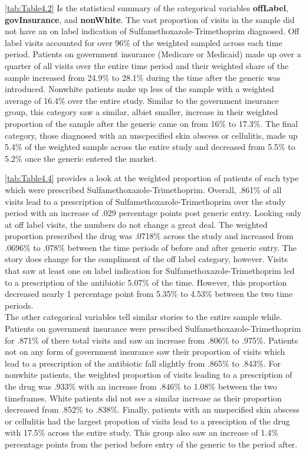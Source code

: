 \begin{landscape}

\end{landscape} 
\indent \autoref{tab:Table4.2} Is the statistical summary of the categorical variables \textbf{offLabel}, \textbf{govInsurance}, and \textbf{nonWhite}. The vast proportion of visits in the sample did not have an on label indication of Sulfamethoxazole-Trimethoprim diagnosed. Off label visits accounted for over 96\% of the weighted sampled across each time period. Patients on government insurance (Medicare or Medicaid) made up over a quarter of all visits over the entire time period and their weighted share of the sample increased from 24.9\% to 28.1\% during the time after the generic was introduced. Nonwhite patients make up less of the sample with a weighted average of 16.4\% over the entire study. Similar to the government insurance group, this category saw a similar, albiet smaller, increase in their weighted proportion of the sample after the generic came on from 16\% to 17.3\%. The final category, those diagnosed with an unscpecified skin abscess or cellulitis, made up 5.4\% of the weighted sample across the entire study and decreased from 5.5\% to 5.2\% once the generic entered the market.
\begin{landscape}

\end{landscape}
\autoref{tab:Table4.4} provides a look at the weighted proportion of patients of each type which were prescribed Sulfamethoxazole-Trimethoprim. Overall, .861\% of all visits lead to a prescription of Sulfamethoxazole-Trimethoprim over the study period with an increase of .029 percentage points post generic entry. Looking only at off label visits, the numbers do not change a great deal. The weighted proportion prescribed the drug was .0718\% across the study and increased from .0696\% to .078\% between the time periods of before and after generic entry. The story does change for the compliment of the off label category, however. Visits that saw at least one on label indication for Sulfamethoxazole-Trimethoprim led to a prescription of the antibiotic 5.07\% of the time. However, this proportion decreased nearly 1 percentage point from 5.35\% to 4.53\% between the two time periods.\\
\indent The other categorical variables tell similar stories to the entire sample while. Patients on government insurance were prescibed Sulfamethoxazole-Trimethoprim for .871\% of there total visits and saw an increase from .806\% to .975\%. Patients not on any form of government insurance saw their proportion of visits which lead to a prescription of the antibiotic fall slightly from .865\% to .843\%. For nonwhite patients, the weighted proportion of visits leading to a prescription of the drug was .933\% with an increase from .846\% to 1.08\% between the two timeframes. White patients did not see a similar increase as their proportion decreased from .852\% to .838\%. Finally, patients with an unspecified skin abscess or cellulitis had the largest propotion of visits lead to a presciption of the drug with 17.5\% across the entire study. This group also saw an increase of 1.4\% percentage points from the period before entry of the generic to the period after. 
\begin{landscape}

\end{landscape}